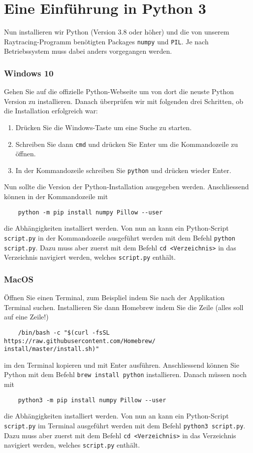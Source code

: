 \section{Eine Einführung in Python 3}\label{sec:einfuerung}
Nun installieren wir Python (Version 3.8 oder höher) und die von unserem Raytracing-Programm benötigten Packages \texttt{numpy} und \texttt{PIL}.
Je nach Betriebssystem muss dabei anders vorgegangen werden.

\subsubsection*{Windows 10}
Gehen Sie auf die offizielle Python-Webseite um von dort die neuste Python Version zu installieren.
Danach überprüfen wir mit folgenden drei Schritten, ob die Installation erfolgreich war:
\begin{enumerate}
	\item Drücken Sie die Windows-Taste um eine Suche zu starten.
	\item Schreiben Sie dann \texttt{cmd} und drücken Sie Enter um die Kommandozeile zu öffnen.
	\item In der Kommandozeile schreiben Sie \texttt{python} und drücken wieder Enter.
\end{enumerate}
Nun sollte die Version der Python-Installation ausgegeben werden.
Anschliessend können in der Kommandozeile mit
\begin{verbatim}
	python -m pip install numpy Pillow --user
\end{verbatim}
die Abhängigkeiten installiert werden.
Von nun an kann ein Python-Script \texttt{script.py} in der Kommandozeile ausgeführt werden mit dem Befehl \texttt{python script.py}.
Dazu muss aber zuerst mit dem Befehl \texttt{cd <Verzeichnis>} in das Verzeichnis navigiert werden, welches \texttt{script.py} enthält.

\subsubsection*{MacOS}
Öffnen Sie einen Terminal, zum Beispliel indem Sie nach der Applikation Terminal suchen.
Installieren Sie dann Homebrew indem Sie die Zeile (alles soll auf eine Zeile!)
\begin{verbatim}
	/bin/bash -c "$(curl -fsSL https://raw.githubusercontent.com/Homebrew/
install/master/install.sh)"
\end{verbatim}
im den Terminal kopieren und mit Enter ausführen.
Anschliessend können Sie Python mit dem Befehl \texttt{brew install python} installieren.
Danach müssen noch mit
\begin{verbatim}
	python3 -m pip install numpy Pillow --user
\end{verbatim}
die Abhängigkeiten installiert werden.
Von nun an kann ein Python-Script \texttt{script.py} im Terminal ausgeführt werden mit dem Befehl \texttt{python3 script.py}.
Dazu muss aber zuerst mit dem Befehl \texttt{cd <Verzeichnis>} in das Verzeichnis navigiert werden, welches \texttt{script.py} enthält.

